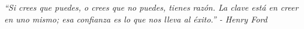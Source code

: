 \thispagestyle{empty}
\null\vfill
\begin{flushright}

{\large \textit{``Si crees que puedes, o crees que no puedes, tienes razón. La clave está en creer en uno mismo; esa confianza es lo que nos lleva al éxito.'' - Henry Ford}}

\end{flushright}
